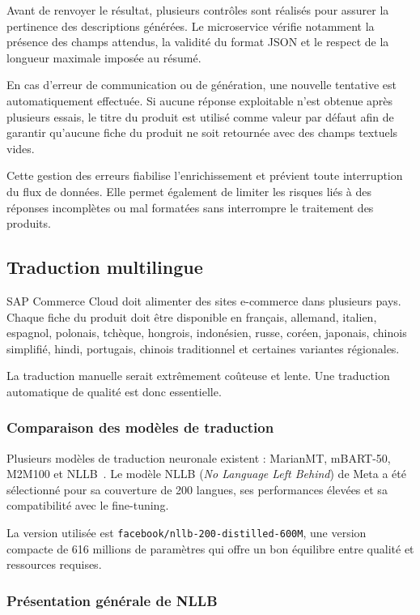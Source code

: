 Avant de renvoyer le résultat, plusieurs contrôles sont réalisés pour assurer la pertinence des descriptions générées. Le microservice vérifie notamment la présence des champs attendus, la validité du format JSON et le respect de la longueur maximale imposée au résumé.

En cas d'erreur de communication ou de génération, une nouvelle tentative est automatiquement effectuée. Si aucune réponse exploitable n'est obtenue après plusieurs essais, le titre du produit est utilisé comme valeur par défaut afin de garantir qu'aucune fiche du produit ne soit retournée avec des champs textuels vides.

Cette gestion des erreurs fiabilise l'enrichissement et prévient toute interruption du flux de données. Elle permet également de limiter les risques liés à des réponses incomplètes ou mal formatées sans interrompre le traitement des produits.
\newpage
\subsection{Traduction multilingue}

SAP Commerce Cloud doit alimenter des sites e-commerce dans plusieurs pays. Chaque fiche du produit doit être disponible en français, allemand, italien, espagnol, polonais, tchèque, hongrois, indonésien, russe, coréen, japonais, chinois simplifié, hindi, portugais, chinois traditionnel et certaines variantes régionales.

La traduction manuelle serait extrêmement coûteuse et lente. Une traduction automatique de qualité est donc essentielle.

\subsubsection{Comparaison des modèles de traduction}

Plusieurs modèles de traduction neuronale existent : MarianMT, mBART-50, M2M100 et NLLB~\cite{translation_models}. Le modèle NLLB (\textit{No Language Left Behind}) de Meta a été sélectionné pour sa couverture de 200 langues, ses performances élevées et sa compatibilité avec le fine-tuning.

La version utilisée est \texttt{facebook/nllb-200-distilled-600M}, une version compacte de 616 millions de paramètres qui offre un bon équilibre entre qualité et ressources requises.

\subsubsection{Présentation générale de NLLB}


